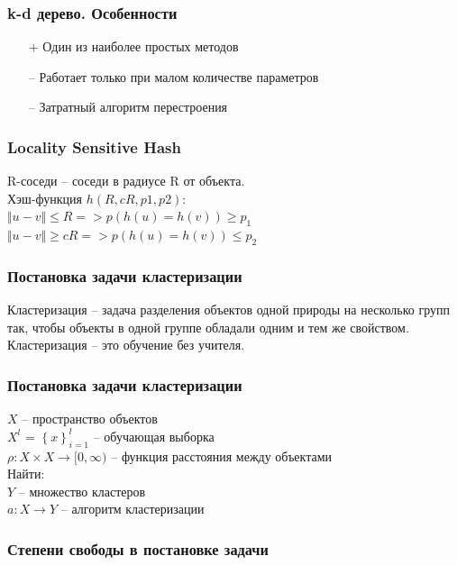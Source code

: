 \documentclass[12pt]{beamer}
\begin{document}
\begin{frame}\frametitle{k-d дерево. Особенности}
\begin{itemize}
\item[+] Один из наиболее простых методов
\item[--] Работает только при малом количестве параметров
\item[--] Затратный алгоритм перестроения

\end{itemize}
\end{frame}

\begin{frame}\frametitle{Locality Sensitive Hash}
R-соседи -- соседи в радиусе R от объекта.\\
\vspace{5mm}
Хэш-функция $h(R, cR, p1, p2)$:\\
$\Vert u - v \Vert  \leq R => p(h(u) = h(v)) \geq p_1$ \\
$\Vert u - v \Vert  \geq cR => p(h(u) = h(v)) \leq p_2$ 
\end{frame}

\begin{frame}\frametitle{Постановка задачи кластеризации}
Кластеризация -- задача разделения объектов одной природы на несколько групп так, чтобы объекты в одной группе обладали одним и тем же свойством.\\
\vspace{5mm}
Кластеризация -- это обучение без учителя.
\end{frame}

\begin{frame}\frametitle{Постановка задачи кластеризации}
$X$ -- пространство объектов\\
$X^l$ = $\left\{ x\right\}_{i=1}^l$ -- обучающая выборка\\
$\rho: X \times X \rightarrow [0, \infty)$ -- функция расстояния между объектами\\
\vspace{5mm}
Найти:\\
$Y$ -- множество кластеров \\
$a: X \rightarrow Y$ -- алгоритм кластеризации
\vspace{5mm}

\end{frame}

\begin{frame}\frametitle{Степени свободы в постановке задачи}
\end{frame}
\end{document}

